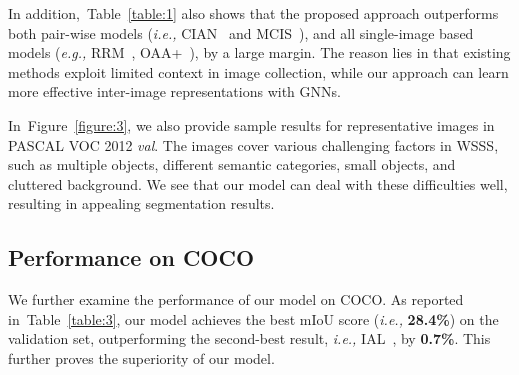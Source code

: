\documentclass[letterpaper]{article} \usepackage{aaai21}  \usepackage{times}  \usepackage{helvet} \usepackage{courier}  \usepackage[hyphens]{url}  \usepackage{graphicx} \urlstyle{rm} \def\UrlFont{\rm}  \usepackage{graphicx}  \usepackage{natbib}  \usepackage{caption} \frenchspacing  \setlength{\pdfpagewidth}{8.5in}  \setlength{\pdfpageheight}{11in}
\newcommand{\tabref}[1]{Table~\ref{#1}}
\newcommand{\figref}[1]{Figure~\ref{#1}}
\newcommand{\eg}[1]{\textit{e.g.,}}
\newcommand{\ie}[1]{\textit{i.e.,}}
\begin{document}
In addition,~\tabref{table:1} also shows that the proposed approach outperforms both pair-wise models (\ie, CIAN~\cite{fan2020cian} and MCIS~\cite{sun2020mining}), and all single-image based models (\eg, RRM~\cite{zhang2020reliability}, OAA+~\cite{jiang2019integral}), by a large margin. The reason lies in that existing methods exploit limited context in image collection, while our approach can learn more effective inter-image representations with GNNs. 






In~\figref{figure:3}, we also provide sample results for representative images in PASCAL VOC 2012 \textit{val}. The images cover various challenging factors in WSSS, such as multiple objects, different semantic categories, small objects, and cluttered background. We see that our model can deal with these difficulties well, resulting in appealing segmentation results.



\subsection{Performance on COCO}
We further examine the performance of our model on COCO. As reported in~\tabref{table:3}, our model achieves the best mIoU score (\ie, \textbf{28.4\%}) on the validation set, outperforming the second-best result, \ie, IAL~\cite{wang2020weakly}, by \textbf{0.7\%}. This further proves the superiority of our model.
\end{document}
